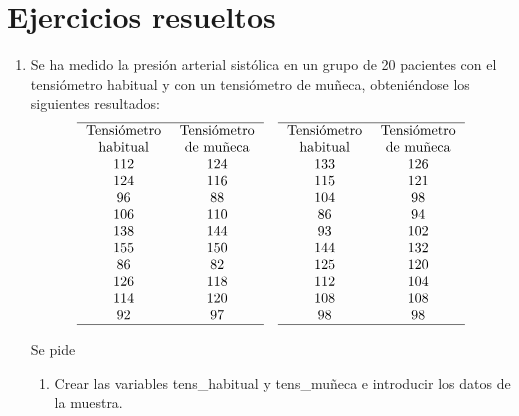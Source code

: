 \section{Ejercicios resueltos}
\begin{enumerate}[leftmargin=*]
\item Se ha medido la presión arterial sistólica en un grupo de 20 pacientes con el tensiómetro habitual y con un tensiómetro de muñeca,
obteniéndose los siguientes resultados:
\[
\begin{array}{cc}
\hline
\multicolumn{1}{p{2cm}}{\centering \text{Tensiómetro} \text{habitual}} & \multicolumn{1}{p{2cm}}{\centering \text{Tensiómetro} \text{de
muñeca}} \\ 
112 & 124 \\ 
124 & 116 \\
 96 &  88 \\
106 & 110 \\
138 & 144 \\
155 & 150 \\
 86 &  82 \\
126 & 118 \\
114 & 120 \\
 92 &  97 \\
\hline
\end{array}
\quad
\begin{array}{cc}
\hline
\multicolumn{1}{p{2cm}}{\centering \text{Tensiómetro} \text{habitual}} & \multicolumn{1}{p{2cm}}{\centering \text{Tensiómetro} \text{de
muñeca}} \\ 
133 & 126 \\
115 & 121 \\
104 &  98 \\
 86 &  94 \\
 93 & 102 \\
144 & 132 \\
125 & 120 \\
112 & 104 \\
108 & 108 \\
 98 &  98 \\
\hline
\end{array}
\]

Se pide
\begin{enumerate}
\item Crear las variables \textsf{tens\_habitual} y \textsf{tens\_muñeca} e introducir los datos de la muestra.


\end{enumerate}
\end{enumerate}
